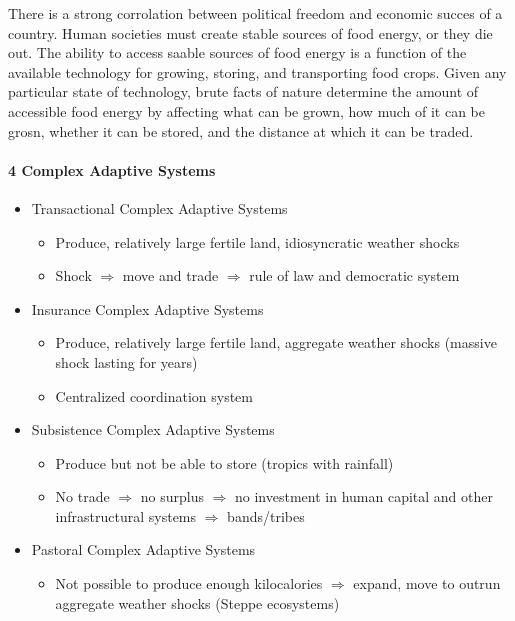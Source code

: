 There is a strong corrolation between political freedom and economic succes
of a country. Human societies must create stable sources of food energy, or
they die out. The ability to access saable sources of food energy is a function
of the available technology for growing, storing, and transporting food crops.
Given any particular state of technology, brute facts of nature determine the
amount of accessible food energy by affecting what can be grown, how much of it
can be grosn, whether it can be stored, and the distance at which it can be
traded.

\paragraph{4 Complex Adaptive Systems}

\begin{itemize}
    \item Transactional Complex Adaptive Systems
        \begin{itemize}
            \item Produce, relatively large fertile land, idiosyncratic weather shocks
            \item Shock $\Rightarrow$ move and trade $\Rightarrow$ rule of law and democratic system
        \end{itemize}
    \item Insurance Complex Adaptive Systems
        \begin{itemize}
            \item Produce, relatively large fertile land, aggregate weather shocks
                (massive shock lasting for years)
            \item Centralized coordination system
        \end{itemize}
    \item Subsistence Complex Adaptive Systems
        \begin{itemize}
            \item Produce but not be able to store (tropics with rainfall)
            \item No trade $\Rightarrow$ no surplus $\Rightarrow$ no investment
                in human capital and other infrastructural systems $\Rightarrow$ bands/tribes
        \end{itemize}
    \item Pastoral Complex Adaptive Systems
        \begin{itemize}
            \item Not possible to produce enough kilocalories $\Rightarrow$
                expand, move to outrun aggregate weather shocks (Steppe ecosystems)
        \end{itemize}
\end{itemize}
